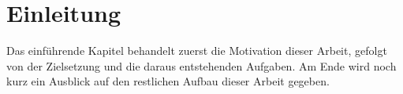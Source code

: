 \chapter{Einleitung}
Das einführende Kapitel behandelt zuerst die Motivation dieser Arbeit, gefolgt von
der Zielsetzung und die daraus entstehenden Aufgaben. Am Ende wird noch kurz ein
Ausblick auf den restlichen Aufbau dieser Arbeit gegeben.






